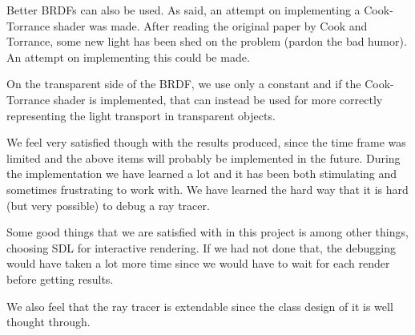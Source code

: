 \documentclass[a4paper]{report}
\begin{document}
Better BRDFs can also be used. As said, an attempt on implementing a
Cook-Torrance shader was made. After reading the original paper by
Cook and Torrance, some new light has been shed on the problem (pardon
the bad humor). An attempt on implementing this could be made.

On the transparent side of the BRDF, we use only a constant and if the
Cook-Torrance shader is implemented, that can instead be used for more
correctly representing the light transport in transparent objects.

We feel very satisfied though with the results produced, since the
time frame was limited and the above items will probably be
implemented in the future. During the implementation we have learned a
lot and it has been both stimulating and sometimes frustrating to work
with. We have learned the hard way that it is hard (but very possible)
to debug a ray tracer.

Some good things that we are satisfied with in this project is among
other things, choosing SDL for interactive rendering. If we had not
done that, the debugging would have taken a lot more time since we
would have to wait for each render before getting results.

We also feel that the ray tracer is extendable since the class design
of it is well thought through.



\end{document}
